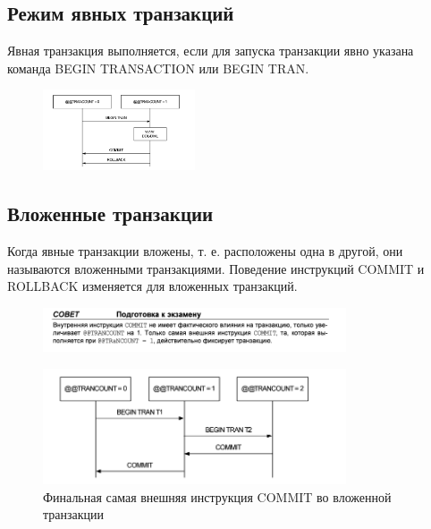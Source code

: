 \subsection{Режим явных транзакций}

Явная транзакция выполняется, если для запуска транзакции явно указана
команда BEGIN TRANSACTION или BEGIN TRAN. 


\begin{figure}[h!]
	\begin{center}
		\includegraphics[width=0.4\textwidth]{img/t3.png}
	\end{center}
	\captionsetup{justification=centering}
\end{figure}


\subsection{Вложенные транзакции}

Когда явные транзакции вложены, т. е. расположены одна в другой, они называются вложенными транзакциями. Поведение инструкций COMMIT и
ROLLBACK изменяется для вложенных транзакций. 

\begin{figure}[h!]
	\begin{center}
		\includegraphics[width=0.8\textwidth]{img/advice25.png}
	\end{center}
	\captionsetup{justification=centering}
\end{figure}

\begin{figure}[h!]
	\begin{center}
		\includegraphics[width=0.8\textwidth]{img/t4.png}
	\end{center}
	\caption{Финальная самая внешняя инструкция COMMIT во вложенной транзакции}
	\captionsetup{justification=centering}
\end{figure}


